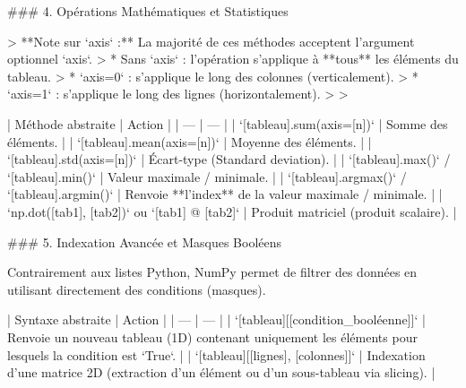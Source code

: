 ### 4. Opérations Mathématiques et Statistiques

> **Note sur `axis` :** La majorité de ces méthodes acceptent l'argument optionnel `axis`.
> * Sans `axis` : l'opération s'applique à **tous** les éléments du tableau.
> * `axis=0` : s'applique le long des colonnes (verticalement).
> * `axis=1` : s'applique le long des lignes (horizontalement).
> 
> 

| Méthode abstraite | Action |
| --- | --- |
| `[tableau].sum(axis=[n])` | Somme des éléments. |
| `[tableau].mean(axis=[n])` | Moyenne des éléments. |
| `[tableau].std(axis=[n])` | Écart-type (Standard deviation). |
| `[tableau].max()` / `[tableau].min()` | Valeur maximale / minimale. |
| `[tableau].argmax()` / `[tableau].argmin()` | Renvoie **l'index** de la valeur maximale / minimale. |
| `np.dot([tab1], [tab2])` ou `[tab1] @ [tab2]` | Produit matriciel (produit scalaire). |

### 5. Indexation Avancée et Masques Booléens

Contrairement aux listes Python, NumPy permet de filtrer des données en utilisant directement des conditions (masques).

| Syntaxe abstraite | Action |
| --- | --- |
| `[tableau][[condition_booléenne]]` | Renvoie un nouveau tableau (1D) contenant uniquement les éléments pour lesquels la condition est `True`. |
| `[tableau][[lignes], [colonnes]]` | Indexation d'une matrice 2D (extraction d'un élément ou d'un sous-tableau via slicing). |